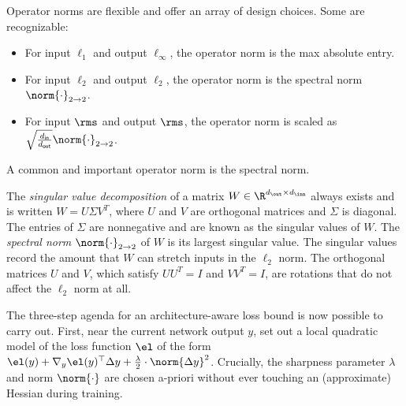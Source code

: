 Operator norms are flexible and offer an array of design choices. Some are recognizable:
\begin{itemize}
    \item For input $\ell_1$ and output $\ell_\infty$, the operator norm is the max absolute entry.
    \item For input $\ell_2$ and output $\ell_2$, the operator norm is the spectral norm $\norm{\cdot}_{2 \to 2}$.
    \item For input $\rms$ and output $\rms$, the operator norm is scaled as $\sqrt{\tfrac{d_\mathsf{in}}{d_\mathsf{out}}} \norm{\cdot}_{2 \to 2}$.
\end{itemize}

A common and important operator norm is the spectral norm.

\begin{definitionbox}
    The \textit{singular value decomposition} of a matrix $W \in \R^{d_\out \times d_\inn}$ always exists and is written $W = U \Sigma V^T$, where $U$ and $V$ are orthogonal matrices and $\Sigma$ is diagonal. The entries of $\Sigma$ are nonnegative and are known as the singular values of $W$. The \textit{spectral norm} $\norm{\cdot}_{2 \to 2}$ of $W$ is its largest singular value. The singular values record the amount that $W$ can stretch inputs in the $\ell_2$ norm. The orthogonal matrices $U$ and $V$, which satisfy $UU^T = I$ and $VV^T = I$, are rotations that do not affect the $\ell_2$ norm at all.
\end{definitionbox}




    

    

The three-step agenda for an architecture-aware loss bound is now possible to carry out. First, near the current network output $y$, set out a local quadratic model of the loss function $\el$ of the form $\el(y) + \nabla_y \el(y)^\top\Delta y + \frac{\lambda}{2}\cdot \norm{\Delta y}^2$. Crucially, the sharpness parameter $\lambda$ and norm $\norm{\cdot}$ are chosen a-priori without ever touching an (approximate) Hessian during training.

